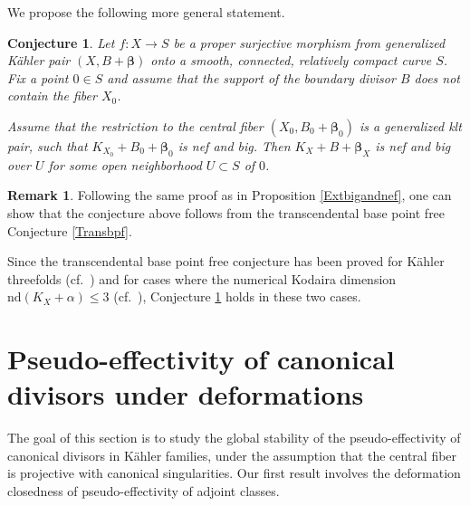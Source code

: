 \documentclass[12pt]{amsart}
\numberwithin{equation}{section}
\theoremstyle{definition}
\theoremstyle{plain}
\newtheorem{conjecture}  [theorem]     {Conjecture}
\newtheorem*{thm A*}{Theorem A}
\newtheorem*{thm B*}{Theorem B}
\newtheorem*{thm C*}{Theorem C}
\newtheorem*{thm D*}{Theorem D}
\theoremstyle{definition}
\newtheorem{remark}  [theorem]     {Remark}
\renewcommand{\1}{\mathds{1}}
\newcommand{\bbeta}{\boldsymbol{\beta}}
\renewcommand{\>}{\rightarrow}
\begin{document}
We propose the following more general statement. 
\begin{conjecture}\label{conj: bignef}
Let $f:X\to S$ be a proper surjective morphism from %
generalized K\"ahler pair $(X,B +  { \boldsymbol{\beta}})$ onto a smooth, connected, relatively compact curve $S$. Fix a point $0\in S$ and assume that the support of the boundary divisor $B$ does not contain the fiber $X_0$. 

Assume that the restriction to the central fiber $(X_0,B_0 +  { \boldsymbol{\beta}}_0)$ is a generalized klt pair, such that $K_{X_0}+B_0 +  { {\bbeta}}_0$ is nef and big. Then $K_{X}  + B +  { {\bbeta}_X}$ is nef and big over $U$ for some open neighborhood $U\subset S$ of $0$. 
\end{conjecture}

\begin{remark}\label{Extbigandnef3fold}
Following the same proof as in Proposition  \ref{Extbigandnef}, one can show that the conjecture above follows from the transcendental base point free Conjecture \ref{Transbpf}. 

Since the transcendental base point free conjecture has been proved for K\"ahler threefolds (cf.~\cite{DH24}) and for cases where the numerical Kodaira dimension $\mathrm{nd}(K_X + \alpha) \le 3$ (cf.~\cite{JunSheng}), Conjecture \ref{conj: bignef} holds in these two cases.
\end{remark}


\section{Pseudo-effectivity of canonical divisors under deformations}\label{Section: Deformation pseff}
The goal of this section is to study the global stability of the pseudo-effectivity of canonical divisors in K\"ahler families, under the assumption that the central fiber is projective with canonical singularities. Our first result involves the deformation closedness of pseudo-effectivity of adjoint classes.

\end{document}
